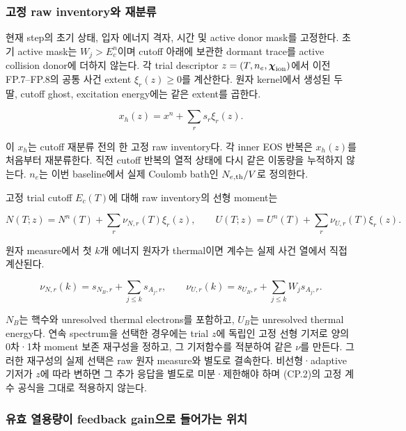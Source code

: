 \documentclass[11pt,a4paper]{article}
\begin{document}
\hypertarget{uxace0uxc815-raw-inventoryuxc640-uxc7acuxbd84uxb958}{%
\subsubsection{고정 raw inventory와 재분류}\label{uxace0uxc815-raw-inventoryuxc640-uxc7acuxbd84uxb958}}

현재 step의 초기 상태, 입자 에너지 격자, 시간 및 active donor mask를 고정한다. 초기 active mask는 \(W_j>E_c^n\)이며 cutoff 아래에 보관한 dormant trace를 active collision donor에 더하지 않는다. 각 trial descriptor \(z=(T,n_e,\boldsymbol\chi_{\rm ion})\)에서 이전 FP.7--FP.8의 공통 사건 extent \(\xi_r(z)\ge0\)를 계산한다. 원자 kernel에서 생성된 두 딸, cutoff ghost, excitation energy에는 같은 extent를 곱한다.

\[
x_h(z)=x^n+\sum_rs_r\xi_r(z).
\tag{CP.1}
\]

이 \(x_h\)는 cutoff 재분류 전의 한 고정 raw inventory다. 각 inner EOS 반복은 \(x_h(z)\)를 처음부터 재분류한다. 직전 cutoff 반복의 열적 상태에 다시 같은 이동량을 누적하지 않는다. \(n_e\)는 이번 baseline에서 실제 Coulomb bath인 \(N_{e,\rm th}/V\)로 정의한다.

고정 trial cutoff \(E_c(T)\)에 대해 raw inventory의 선형 moment는

\[
N(T;z)=N^n(T)+\sum_r\nu_{N,r}(T)\xi_r(z),\qquad
U(T;z)=U^n(T)+\sum_r\nu_{U,r}(T)\xi_r(z).
\tag{CP.2}
\]

원자 measure에서 첫 \(k\)개 에너지 원자가 thermal이면 계수는 실제 사건 열에서 직접 계산된다.

\[
\nu_{N,r}(k)=s_{N_B,r}+\sum_{j\le k}s_{A_j,r},\qquad
\nu_{U,r}(k)=s_{U_B,r}+\sum_{j\le k}W_js_{A_j,r}.
\tag{CP.3}
\]

\(N_B\)는 핵수와 unresolved thermal electrons를 포함하고, \(U_B\)는 unresolved thermal energy다. 연속 spectrum을 선택한 경우에는 trial \(z\)에 독립인 고정 선형 기저로 양의 0차·1차 moment 보존 재구성을 정하고, 그 기저함수를 적분하여 같은 \(\nu\)를 만든다. 그러한 재구성의 실제 선택은 raw 원자 measure와 별도로 결속한다. 비선형·adaptive 기저가 \(z\)에 따라 변하면 그 추가 응답을 별도로 미분·제한해야 하며 (CP.2)의 고정 계수 공식을 그대로 적용하지 않는다.

\hypertarget{uxc720uxd6a8-uxc5f4uxc6a9uxb7c9uxc774-feedback-gainuxc73cuxb85c-uxb4e4uxc5b4uxac00uxb294-uxc704uxce58}{%
\subsubsection{유효 열용량이 feedback gain으로 들어가는 위치}\label{uxc720uxd6a8-uxc5f4uxc6a9uxb7c9uxc774-feedback-gainuxc73cuxb85c-uxb4e4uxc5b4uxac00uxb294-uxc704uxce58}}
\end{document}
